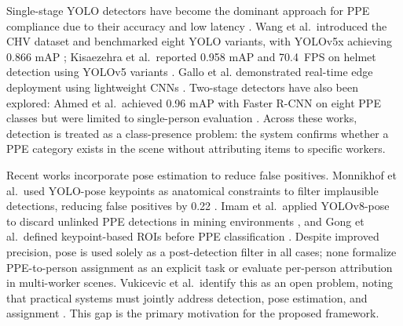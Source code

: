\documentclass[conference,a4paper]{IEEEtran}
\begin{document}
Single-stage YOLO detectors have become the dominant approach for PPE compliance due to their accuracy and low latency \cite{ref6}. Wang et al.\ introduced the CHV dataset and benchmarked eight YOLO variants, with YOLOv5x achieving 0.866 mAP \cite{ref5}; Kisaezehra et al.\ reported 0.958 mAP and 70.4~FPS on helmet detection using YOLOv5 variants \cite{ref9}. Gallo et al. demonstrated real-time edge deployment using lightweight CNNs \cite{ref14}. Two-stage detectors have also been explored: Ahmed et al.\ achieved 0.96 mAP with Faster R-CNN on eight PPE classes but were limited to single-person evaluation \cite{ref23}. Across these works, detection is treated as a class-presence problem: the system confirms whether a PPE category exists in the scene without attributing items to specific workers.

Recent works incorporate pose estimation to reduce false positives. Monnikhof et al.\ used YOLO-pose keypoints as anatomical constraints to filter implausible detections, reducing false positives by 0.22 \cite{ref8}. Imam et al.\ applied YOLOv8-pose to discard unlinked PPE detections in mining environments \cite{ref12}, and Gong et al.\ defined keypoint-based ROIs before PPE classification \cite{ref13}. Despite improved precision, pose is used solely as a post-detection filter in all cases; none formalize PPE-to-person assignment as an explicit task or evaluate per-person attribution in multi-worker scenes. Vukicevic et al.\ identify this as an open problem, noting that practical systems must jointly address detection, pose estimation, and assignment \cite{ref6}. This gap is the primary motivation for the proposed framework.
\end{document}
